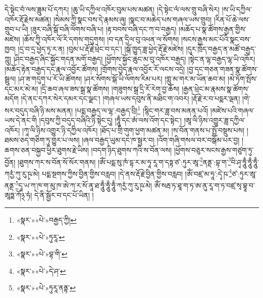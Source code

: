 དེ་སྟེང་བཾ་ལས་ཟླུམ་པོ་དཀར། །ཆུ་ཡི་དཀྱིལ་འཁོར་བུམ་པས་མཚན། །དེ་སྟེང་ལཾ་ལས་གྲུ་བཞི་སེར། །ས་ཡི་དཀྱིལ་འཁོར་རྡོ་རྗེས་མཚན། །སེམས་ཀྱི་སྣང་བས་དེ་རྣམས་ཞུ། །སྣང་བ་མཆེད་པས་གཞལ་ཡས་གྲུབ། །རིན་པོ་ཆེ་ལས་གྲུབ་པ་ཡི། །ཟུར་བཞི་སྒོ་བཞི་ལོགས་བཞི་པ། །རྟ་བབས་བཞི་དང་ཀ་བ་བརྒྱད། །མཆོད་པ་སྣ་ཚོགས་རྒྱན་གྱིས་མཛེས། །ཆོས་ཀྱི་འཁོར་ལོ་རི་དགས་གདུགས། །བ་དན་དྲིལ་བུ་འཕན་ལ་སོགས། །སངས་རྒྱས་མང་པོའི་སྣང་བས་ཁྱབ། །དྲ་བ་དྲ་ཕྱེད་ཏྭ་ར་ན། །བུམ་པ་རྡོ་རྗེ་ཕྲེང་བ་དང་། །སྒོ་ཁྱུད་ཟླ་ཕྱེད་རྡོ་རྗེ་མཛེས། །དུར་ཁྲོད་བརྒྱད་ན་མཚོ་བརྒྱད་ཀླུ། །ཤིང་བརྒྱད་ཞིང་སྐྱོང་གདན་མགོ་བརྒྱད། །ཕྱོགས་སྐྱོང་ཆུང་མ་བུ་འཁོར་བརྒྱད། །སྟེང་ན་ལྷ་བརྒྱད་ལྷ་ཡི་འཁོར། །མཆོད་རྟེན་བརྒྱད་དང་རྣལ་འབྱོར་ཚོགས། །གྲོགས་བྱེད་རྣལ་འབྱོར་རོ་ལངས་འདྲེ། །བྱ་དང་གཅན་གཟན་སྣ་ཚོགས་སྦྲུལ། །ཤ་ཟ་གདུག་པ་རོ་ཡི་ཚོགས། །ཤར་སོགས་སྒོ་ཡི་ལོགས་རིམ་པར། །གླུ་མ་གར་མ་ཡོན་ཆབ་མ། །མེ་ཏོག་སྤོས་དང་མར་མེ་མ། །དྲི་ཆབ་ཞལ་ཟས་སྒྲ་སྣ་ཚོགས། །གཟུགས་སྒྲ་དྲི་རོ་རེག་བྱ་ཆོས། །རྒྱན་ཕྲེང་མ་རྣམས་སྣ་ཚོགས་མདོག །དེ་ནང་དཀར་སེར་དམར་དང་ལྗང་། །གཞལ་ཡས་དབུས་ནི་མཐིང་ག་འབར། །རྡོ་རྗེ་ར་བ་པདྨར་ལྡན། །གེ་སར་བདུད་བཞི་ཉི་མས་མནན། །པདྨ་བརྒྱད་ལ་ལྷ་:བརྒྱད་བྲི།\footnote{«སྣར་»«པེ་»བརྒྱད་ཀྱི།} །སྙིང་གར་ཟླ་བས་མནན་པའོ། །མཛེས་པའི་གཞལ་ཡས་དེ་ནང་གི །དབུས་ཀྱི་བདུད་བཞིའི་ཉི་སྟེང་དུ། །ཧཱུྃ་དང་ཨཾ་ལས་འོག་དང་སྟེང་། །ཨཱ་ལི་ཉིས་འགྱུར་ཟླ་དཀྱིལ་འཁོར། །ཀཱ་ལི་ཉིས་འགྱུར་ཉི་དཀྱིལ་འཁོར། །ཐོད་པ་གྲི་གུག་ཕྱག་མཚན་མ། །ས་བོན་གནས་པ་སྤྲོ་བསྡུས་པས། །ཐམས་ཅད་གཅིག་ཏུ་གྱུར་པ་ལས། །ཞལ་བརྒྱད་ཡུམ་དང་ཁ་སྦྱར་བ། །འོག་གཞི་གསལ་བར་བསྒོམ་པར་བྱ། །ཆགས་ཅན་བསྐྱབ་ཕྱིར་ཐུགས་རྗེ་ཡིས། །བདག་ཉིད་ཐུགས་ཀའི་ས་བོན་ལས། །ཕྱོགས་བཅུར་སངས་རྒྱས་གཙུག་ཏུ་བྱོན། །ཐུགས་ཀར་ས་བོན་སོ་སོར་གནས། །ཨོཾ་པདྨ་སུ་ཁཾ་དྷ་ར་མ་ཧཱ་རཱ་ག་དཏྟ་ཙ་:ཏུར་ཨཱ་\footnote{«སྣར་»«པེ་»ཏུརཱ་}ནནྡ་:བྷ་ག་\footnote{«སྣར་»«པེ་»བྷ་གི་}བི་ཤྭ་ཧཱུྃ་ཧཱུྃ་ཧཱུྃ་ཀརྱཾ་ཀུ་རུ་ཥྭ་མེ། པདྨ་སྔགས་ཀྱིས་བྱིན་གྱིས་བརླབ། །དེ་ནས་རྡོ་རྗེ་བྱིན་གྱིས་བརླབ། །ཨོཾ་བཛྲ་མ་ཧཱ་:དྭེ་ཥ་\footnote{«སྣར་»«པེ་»དེ་ཤ་}ཙ་:ཏུར་ཨཱ་ནནྡ་\footnote{«སྣར་»«པེ་»ཏུརཱ་ནནྟ་}དཱ་ཡ་ཀ་ཁ་ག་མུ་ཁ་ཨེ་ཀ་ར་སོ་ནཱ་ཐ་ཧཱུྃ་ཧཱུྃ་ཧཱུྃ་ཀརྱཾ་ཀུ་རུ་ཥྭ་མེ། ཨོཾ་སརྦ་ཏ་ཐཱ་ག་ཏ་ཨ་ནུ་རཱ་ག་ཏ་བཛྲ་སྭ་བྷཱ་བ་ཨཱཏྨ་ཀོ྅་ཧཾ། དེ་ནི་སྦྱོར་བ་དང་པོ་ཡིན། །
